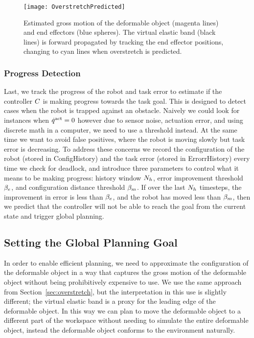\begin{figure}[ht]
    \centering
    \texttt{[image: OverstretchPredicted]}
    \caption{Estimated gross motion of the deformable object (magenta lines) and end effectors (blue spheres). The virtual elastic band (black lines) is forward propagated by tracking the end effector positions, changing to cyan lines when overstretch is predicted.}
    \label{fig:overstretch_predicted}
\end{figure}







\subsubsection{Progress Detection}

Last, we track the progress of the robot and task error to estimate if the controller $C$ is making progress towards the task goal. This is designed to detect cases when the robot is trapped against an obstacle. Naively we could look for instances when $\dot{q}^{\textrm{act}} = 0$ however due to sensor noise, actuation error, and using discrete math in a computer, we need to use a threshold instead. At the same time we want to avoid false positives, where the robot is moving slowly but task error is decreasing. To address these concerns we record the configuration of the robot (stored in ConfigHistory) and the task error (stored in ErrorrHistory) every time we check for deadlock, and introduce three parameters to control what it means to be making progress: history window $N_h$, error improvement threshold $\beta_e$, and configuration distance threshold $\beta_m$. If over the last $N_h$ timesteps, the improvement in error is less than $\beta_e$, and the robot has moved less than $\beta_m$, then we predict that the controller will not be able to reach the goal from the current state and trigger global planning.



\subsection{Setting the Global Planning Goal}
\label{sec:planning_goal}


In order to enable efficient planning, we need to approximate the configuration of the deformable object in a way that captures the gross motion of the deformable object without being prohibitively expensive to use. We use the same approach from Section~\ref{sec:overstretch}, but the interpretation in this use is slightly different; the virtual elastic band is a proxy for the leading edge of the deformable object. In this way we can plan to move the deformable object to a different part of the workspace without needing to simulate the entire deformable object, instead the deformable object conforms to the environment naturally.



